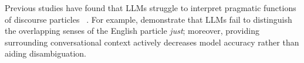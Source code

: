 \documentclass[11pt]{article}
\begin{document}


Previous studies have found that LLMs struggle to interpret pragmatic functions of discourse particles ~\citep{sheffield2025just,sadlierbrown2024context,eindor2022fortunately}. For example, \citet{sheffield2025just} demonstrate that LLMs fail to distinguish the overlapping senses of the English particle \textit{just}; moreover, providing surrounding conversational context actively decreases model accuracy rather than aiding disambiguation.
\end{document}
